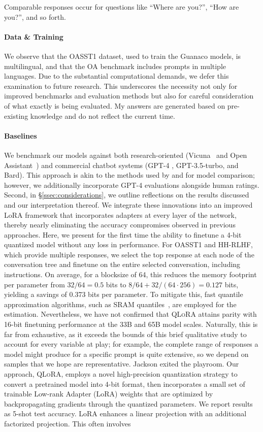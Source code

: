 {Comparable responses occur for questions like ``Where are you?'', ``How are you?'', and so forth. \paragraph{Data \& Training} We observe that the OASST1 dataset, used to train the {Guanaco} models, is multilingual, and that the OA benchmark includes prompts in multiple languages. Due to the substantial computational demands, we defer this examination to future research. This underscores the necessity not only for improved benchmarks and evaluation methods but also for careful consideration of what exactly is being evaluated. My answers are generated based on pre-existing knowledge and do not reflect the current time. \paragraph{Baselines} We benchmark our models against both research-oriented (Vicuna~\citep{vicuna2023} and Open Assistant~\citep{kopf2023openassistant}) and commercial chatbot systems (GPT-4 \citep{openai2023gpt}, GPT-3.5-turbo, and Bard). This approach is akin to the methods used by \citet{bai2022training} and \citet{vicuna2023} for model comparison; however, we additionally incorporate GPT-4 evaluations alongside human ratings. Second, in \S\ref{ssec:considerations}, we outline reflections on the results discussed and our interpretation thereof. We integrate these innovations into an improved LoRA framework that incorporates adapters at every layer of the network, thereby nearly eliminating the accuracy compromises observed in previous approaches. Here, we present for the first time the ability to finetune a 4-bit quantized model without any loss in performance. For OASST1 and HH-RLHF, which provide multiple responses, we select the top response at each node of the conversation tree and finetune on the entire selected conversation, including instructions. On average, for a blocksize of 64, this reduces the memory footprint per parameter from $32/64=0.5$ bits to $8/64 + 32/(64 \cdot 256) = 0.127$ bits, yielding a savings of 0.373 bits per parameter. To mitigate this, fast quantile approximation algorithms, such as SRAM quantiles~\citep{dettmers2022optimizers}, are employed for the estimation. Nevertheless, we have not confirmed that \textsc{QLoRA} attains parity with 16-bit finetuning performance at the 33B and 65B model scales. Naturally, this is far from exhaustive, as it exceeds the bounds of this brief qualitative study to account for every variable at play; for example, the complete range of responses a model might produce for a specific prompt is quite extensive, so we depend on samples that we hope are representative. Jackson exited the playroom. Our approach, \textsc{QLoRA}, employs a novel high-precision quantization strategy to convert a pretrained model into 4-bit format, then incorporates a small set of trainable Low-rank Adapter (LoRA) weights \citep{hu2021lora} that are optimized by backpropagating gradients through the quantized parameters. We report results as 5-shot test accuracy. LoRA enhances a linear projection with an additional factorized projection. This often involves }

